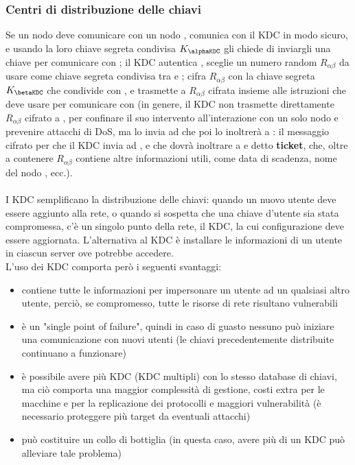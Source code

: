 \subsubsection{Centri di distribuzione delle chiavi}
Se un nodo \alpha deve comunicare con un nodo \beta, \alpha comunica con il KDC in modo sicuro, e usando la loro chiave segreta condivisa $K_{\alphaKDC}$ gli chiede di inviargli una chiave per comunicare con \beta; il KDC autentica \alpha, sceglie un numero random $ R_{\alpha\beta} $ da usare come chiave segreta condivisa tra \alpha e \beta; cifra $ R_{\alpha\beta} $ con la chiave segreta $K_{\betaKDC}$ che condivide con \beta, e trasmette a \beta $ R_{\alpha\beta} $ cifrata insieme alle istruzioni che \beta deve usare per comunicare con \alpha (in genere, il KDC non trasmette direttamente $ R_{\alpha\beta} $ cifrato a \beta, per confinare il suo intervento all'interazione con un solo nodo e prevenire attacchi di DoS, ma lo invia ad \alpha che poi lo inoltrerà a \beta:
il messaggio cifrato per \beta che il KDC invia ad \alpha, e che \alpha dovrà inoltrare a \beta e detto \textbf{ticket}, che, oltre a contenere $ R_{\alpha\beta} $ contiene altre informazioni utili, come data di scadenza, nome del nodo \alpha, ecc.). \\ \\
I KDC semplificano la distribuzione delle chiavi: quando un nuovo utente deve essere aggiunto alla rete, o quando si sospetta che una chiave d’utente sia stata compromessa, c’è un singolo punto della rete, il KDC, la cui configurazione deve essere aggiornata. L’alternativa al KDC è installare le informazioni di un utente in ciascun server ove potrebbe accedere. \\
L'uso dei KDC comporta però i seguenti svantaggi: 
\begin{itemize}
\item contiene tutte le informazioni per impersonare un utente ad un qualsiasi altro utente, perciò, se compromesso, tutte le risorse di rete risultano vulnerabili
\item è un "single point of failure", quindi in caso di guasto nessuno può iniziare una comunicazione con nuovi utenti (le chiavi precedentemente distribuite continuano a funzionare)
\item è possibile avere più KDC (KDC multipli) con lo stesso database di chiavi, ma ciò comporta una maggior complessità di gestione, costi extra per le macchine e per la replicazione dei protocolli e maggiori vulnerabilità (è necessario proteggere più target da eventuali attacchi)
\item può costituire un collo di bottiglia (in questa caso, avere più di un KDC può alleviare tale problema)
\end{itemize}  


